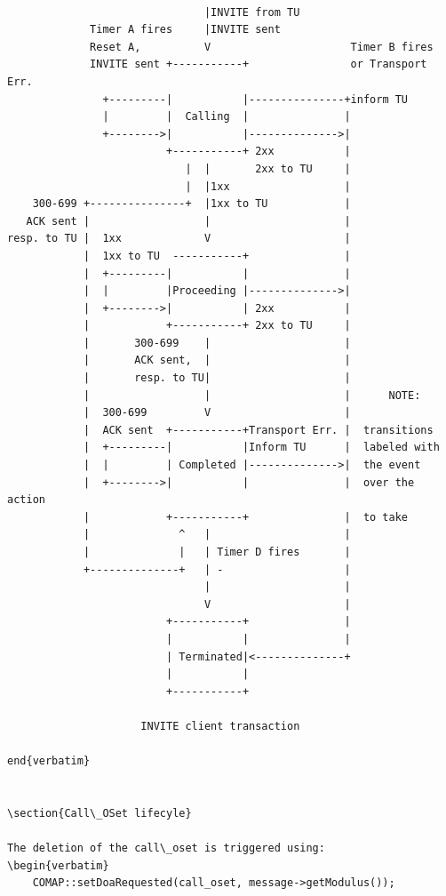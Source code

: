 \documentclass[a4paper]{article}
\begin{document}
\pagebreak
\begin{verbatim}

                               |INVITE from TU
             Timer A fires     |INVITE sent
             Reset A,          V                      Timer B fires
             INVITE sent +-----------+                or Transport Err.
               +---------|           |---------------+inform TU
               |         |  Calling  |               |
               +-------->|           |-------------->|
                         +-----------+ 2xx           |
                            |  |       2xx to TU     |
                            |  |1xx                  |
    300-699 +---------------+  |1xx to TU            |
   ACK sent |                  |                     |
resp. to TU |  1xx             V                     |
            |  1xx to TU  -----------+               |
            |  +---------|           |               |
            |  |         |Proceeding |-------------->|
            |  +-------->|           | 2xx           |
            |            +-----------+ 2xx to TU     |
            |       300-699    |                     |
            |       ACK sent,  |                     |
            |       resp. to TU|                     |
            |                  |                     |      NOTE:
            |  300-699         V                     |
            |  ACK sent  +-----------+Transport Err. |  transitions
            |  +---------|           |Inform TU      |  labeled with
            |  |         | Completed |-------------->|  the event
            |  +-------->|           |               |  over the action
            |            +-----------+               |  to take
            |              ^   |                     |
            |              |   | Timer D fires       |
            +--------------+   | -                   |
                               |                     |
                               V                     |
                         +-----------+               |
                         |           |               |
                         | Terminated|<--------------+
                         |           |
                         +-----------+

                     INVITE client transaction

end{verbatim}


\section{Call\_OSet lifecyle}

The deletion of the call\_oset is triggered using:
\begin{verbatim}
	COMAP::setDoaRequested(call_oset, message->getModulus());
\end{verbatim} 
\end{document}

